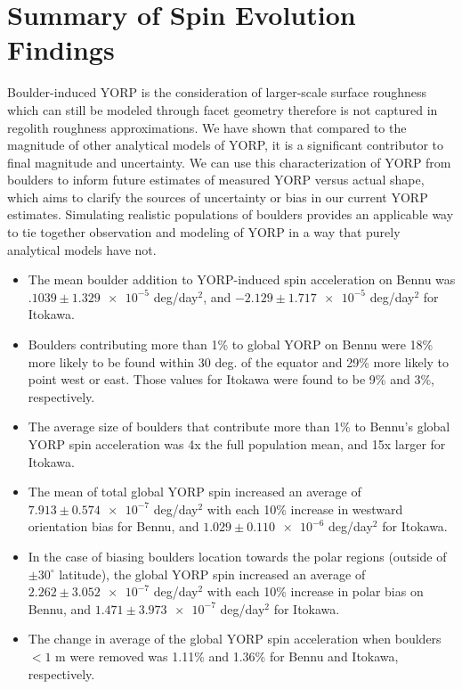 \section{Summary of Spin Evolution Findings} \label{conclusion}
Boulder-induced YORP is the consideration of larger-scale surface roughness which can still be modeled through facet geometry therefore is not captured in regolith roughness approximations. We have shown that compared to the magnitude of other analytical models of YORP, it is a significant contributor to final magnitude and uncertainty. We can use this characterization of YORP from boulders to inform future estimates of measured YORP versus actual shape, which aims to clarify the sources of uncertainty or bias in our current YORP estimates. Simulating realistic populations of boulders provides an applicable way to tie together observation and modeling of YORP in a way that purely analytical models have not.

\begin{itemize}
    \item The mean boulder addition to YORP-induced spin acceleration on Bennu was $.1039 \pm \num{1.329e-5}$ deg/day$^2$, and $\num{-2.129} \pm \num{1.717e-5}$ deg/day$^2$ for Itokawa.
    \item Boulders contributing more than 1\% to global YORP on Bennu were 18\% more likely to be found within 30 deg. of the equator and 29\% more likely to point west or east. Those values for Itokawa were found to be 9\% and 3\%, respectively. 
    \item The average size of boulders that contribute more than 1\% to Bennu's global YORP spin acceleration was 4x the full population mean, and 15x larger for Itokawa.
    \item The mean of total global YORP spin increased an average of $7.913 \pm \num{0.574e-7}$ deg/day$^2$ with each 10\% increase in westward orientation bias for Bennu, and $1.029 \pm \num{0.110e-6}$ deg/day$^2$ for Itokawa.
    \item In the case of biasing boulders location towards the polar regions (outside of $\pm 30^{\circ}$ latitude), the global YORP spin increased an average of $2.262 \pm \num{3.052e-7}$ deg/day$^2$ with each 10\% increase in polar bias on Bennu, and $1.471 \pm \num{3.973e-7}$ deg/day$^2$ for Itokawa.
    \item The change in average of the global YORP spin acceleration when boulders $< 1$ m were removed was 1.11\% and 1.36\% for Bennu and Itokawa, respectively.
\end{itemize}

